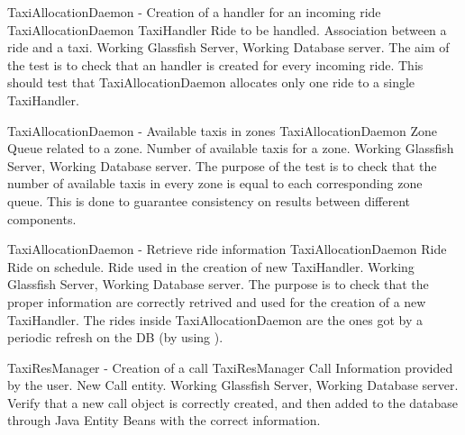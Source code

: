 \testx
{TaxiAllocationDaemon - Creation of a handler for an incoming ride}
{TaxiAllocationDaemon}
{TaxiHandler}
{Ride to be handled.}
{Association between a ride and a taxi.}
{Working Glassfish Server, Working Database server.}
{The aim of the test is to check that an handler is created for every incoming
ride. This should test that TaxiAllocationDaemon allocates only one ride to a single TaxiHandler.}

\testx
{TaxiAllocationDaemon - Available taxis in zones}
{TaxiAllocationDaemon}
{Zone}
{Queue related to a zone.}
{Number of available taxis for a zone.}
{Working Glassfish Server, Working Database server.}
{The purpose of the test is to check that the number of available taxis in every
zone is equal to each corresponding zone queue. This is done to guarantee consistency on results between different components.}

\testx
{TaxiAllocationDaemon - Retrieve ride information}
{TaxiAllocationDaemon}
{Ride}
{Ride on schedule.}
{Ride used in the creation of new TaxiHandler.}
{Working Glassfish Server, Working Database server.}
{The purpose is to check that the proper information are correctly retrived and
used for the creation of a new TaxiHandler. The rides inside TaxiAllocationDaemon are the ones got by a periodic refresh on the DB (by using ).}

\testx
{TaxiResManager - Creation of a call}
{TaxiResManager}
{Call}
{Information provided by the user.}
{New Call entity.}
{Working Glassfish Server, Working Database server.}
{Verify that a new call object is correctly created, and then added to the database through Java Entity Beans with the correct information.}
